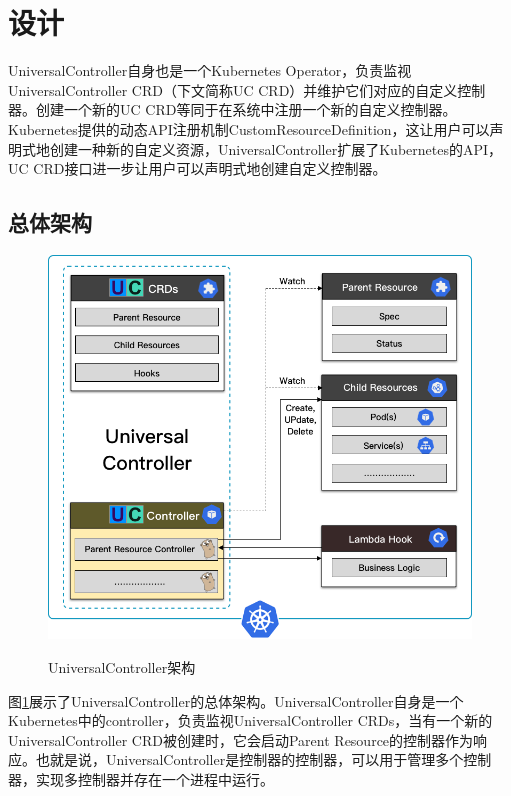 \documentclass[macfonts,master]{njuthesis}
\begin{document}
\section{设计}
UniversalController自身也是一个Kubernetes Operator，负责监视UniversalController CRD（下文简称UC CRD）并维护它们对应的自定义控制器。创建一个新的UC CRD等同于在系统中注册一个新的自定义控制器。Kubernetes提供的动态API注册机制CustomResourceDefinition，这让用户可以声明式地创建一种新的自定义资源，UniversalController扩展了Kubernetes的API，UC CRD接口进一步让用户可以声明式地创建自定义控制器。

\subsection{总体架构}

\begin{figure}[htbp]
  \centering
  \includegraphics[width= 1\textwidth]{pics/uc-arch.png}\\
  \caption{UniversalController架构}\label{fig:uc-arch}
\end{figure}

图\ref{fig:uc-arch}展示了UniversalController的总体架构。UniversalController自身是一个Kubernetes中的controller，负责监视UniversalController CRDs，当有一个新的UniversalController CRD被创建时，它会启动Parent Resource的控制器作为响应。也就是说，UniversalController是控制器的控制器，可以用于管理多个控制器，实现多控制器并存在一个进程中运行。
\end{document}
